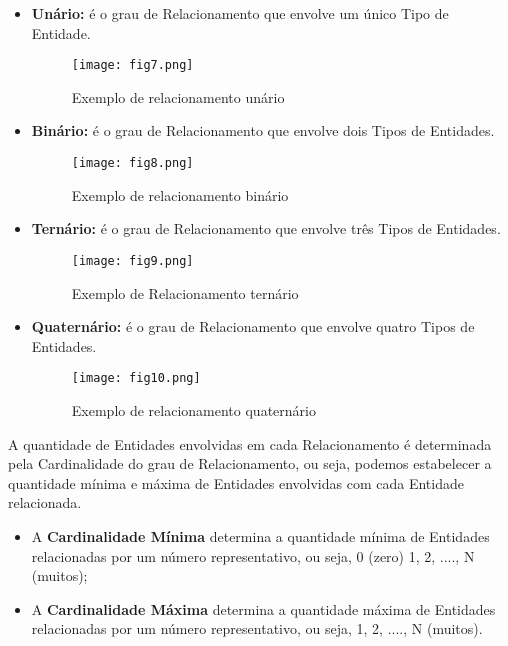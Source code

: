 \documentclass{article}
\begin{document}
\begin{itemize}
    \item \textbf{Unário:} é o grau de Relacionamento que envolve um único Tipo de Entidade.
    \begin{figure}[H]
        \centering
        \texttt{[image: fig7.png]}
        \caption{Exemplo de relacionamento unário}
        \label{fig:fig7}
    \end{figure}
    \item \textbf{Binário:} é o grau de Relacionamento que envolve dois Tipos de Entidades.
    \begin{figure}[H]
        \centering
        \texttt{[image: fig8.png]}
        \caption{Exemplo de relacionamento binário}
        \label{fig:fig8}
    \end{figure}
    \item \textbf{Ternário:} é o grau de Relacionamento que envolve três Tipos de Entidades.
    \begin{figure}[H]
        \centering
        \texttt{[image: fig9.png]}
        \caption{Exemplo de Relacionamento ternário}
        \label{fig:fig9}
    \end{figure}
    \item \textbf{Quaternário:} é o grau de Relacionamento que envolve quatro Tipos de Entidades.
    \begin{figure}[H]
        \centering
        \texttt{[image: fig10.png]}
        \caption{Exemplo de relacionamento quaternário}
        \label{fig:fig10}
    \end{figure}
\end{itemize}


A quantidade de Entidades envolvidas em cada Relacionamento é determinada pela Cardinalidade do grau de Relacionamento, ou seja, podemos estabelecer a quantidade mínima e máxima de Entidades envolvidas com cada Entidade relacionada.


\begin{itemize}
    \item A \textbf{Cardinalidade Mínima} determina a quantidade mínima de Entidades relacionadas por um número representativo, ou seja, 0 (zero) 1, 2, ...., N (muitos);
    \item A \textbf{Cardinalidade Máxima} determina a quantidade máxima de Entidades relacionadas por um número representativo, ou seja, 1, 2, ...., N (muitos).
\end{itemize}
\end{document}
